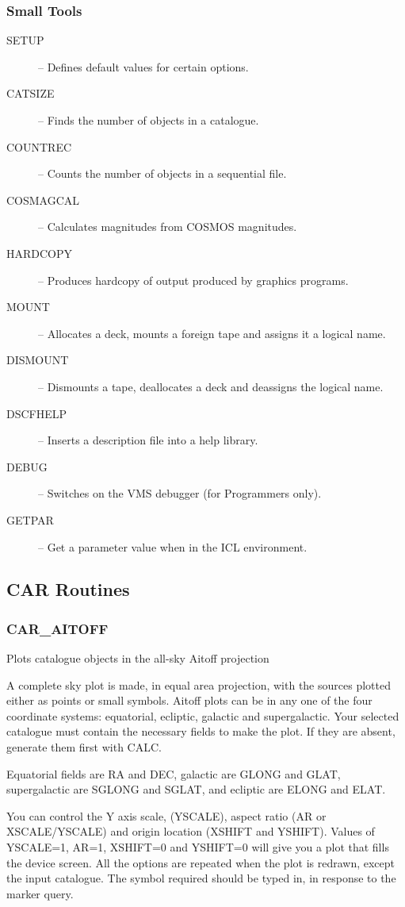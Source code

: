 \subsubsection {Small Tools}
\begin{description}
\item [SETUP] -- Defines default values for certain options.
\item [CATSIZE] -- Finds the number of objects in a catalogue.
\item [COUNTREC] -- Counts the number of objects in a sequential file.
\item [COSMAGCAL] -- Calculates magnitudes from COSMOS magnitudes.
\item [HARDCOPY] -- Produces hardcopy of output produced by graphics programs.
\item [MOUNT] -- Allocates a deck, mounts a foreign tape and assigns it a
logical name.
\item [DISMOUNT] -- Dismounts a tape, deallocates a deck and deassigns the
logical name.
\item [DSCFHELP] -- Inserts a description file into a help library.
\item [DEBUG] -- Switches on the VMS debugger (for Programmers only).
\item [GETPAR] -- Get a parameter value when in the ICL environment.
\end{description}


\subsection {CAR Routines}

\subsubsection{CAR\_AITOFF}

Plots catalogue objects in the all-sky Aitoff projection

A complete sky plot is made, in equal area projection, with the sources
plotted either as points or small symbols.
Aitoff plots can be in any one of the four coordinate systems:
equatorial, ecliptic, galactic and supergalactic.
Your selected catalogue must contain the necessary fields to make the plot.
If they are absent, generate them first with CALC.

Equatorial fields are RA and DEC, galactic are GLONG and GLAT,
supergalactic are SGLONG and SGLAT, and ecliptic are ELONG
and ELAT.

You can control the Y axis scale, (YSCALE), aspect ratio (AR or
XSCALE/YSCALE) and origin location (XSHIFT and YSHIFT).
Values of YSCALE=1, AR=1, XSHIFT=0 and YSHIFT=0 will give you a plot
that fills the device screen.
All the options are repeated when the plot is redrawn, except the input
catalogue.
The symbol required should be typed in, in response to the marker query.

